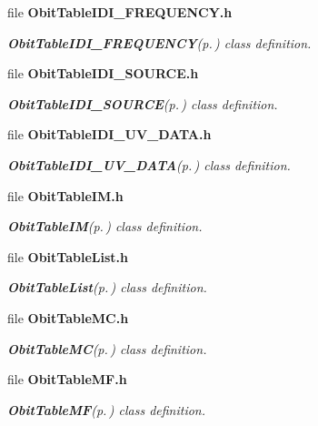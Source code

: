 \begin{CompactItemize}
\item 
file {\bf Obit\-Table\-IDI\_\-FREQUENCY.h}
\begin{CompactList}\small\item\em {\bf Obit\-Table\-IDI\_\-FREQUENCY}{\rm (p.\,\pageref{structObitTableIDI__FREQUENCY})} class definition. \item\end{CompactList}

\item 
file {\bf Obit\-Table\-IDI\_\-SOURCE.h}
\begin{CompactList}\small\item\em {\bf Obit\-Table\-IDI\_\-SOURCE}{\rm (p.\,\pageref{structObitTableIDI__SOURCE})} class definition. \item\end{CompactList}

\item 
file {\bf Obit\-Table\-IDI\_\-UV\_\-DATA.h}
\begin{CompactList}\small\item\em {\bf Obit\-Table\-IDI\_\-UV\_\-DATA}{\rm (p.\,\pageref{structObitTableIDI__UV__DATA})} class definition. \item\end{CompactList}

\item 
file {\bf Obit\-Table\-IM.h}
\begin{CompactList}\small\item\em {\bf Obit\-Table\-IM}{\rm (p.\,\pageref{structObitTableIM})} class definition. \item\end{CompactList}

\item 
file {\bf Obit\-Table\-List.h}
\begin{CompactList}\small\item\em {\bf Obit\-Table\-List}{\rm (p.\,\pageref{structObitTableList})} class definition. \item\end{CompactList}

\item 
file {\bf Obit\-Table\-MC.h}
\begin{CompactList}\small\item\em {\bf Obit\-Table\-MC}{\rm (p.\,\pageref{structObitTableMC})} class definition. \item\end{CompactList}

\item 
file {\bf Obit\-Table\-MF.h}
\begin{CompactList}\small\item\em {\bf Obit\-Table\-MF}{\rm (p.\,\pageref{structObitTableMF})} class definition. \item\end{CompactList}


\end{CompactItemize}

